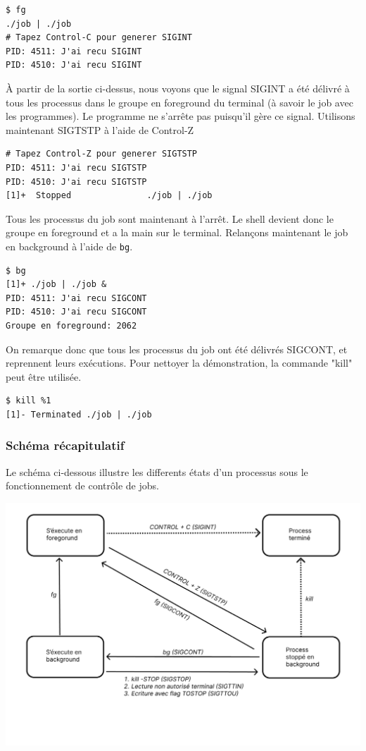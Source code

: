 \begin{lstlisting}[style=blackstyle]
$ fg
./job | ./job
# Tapez Control-C pour generer SIGINT
PID: 4511: J'ai recu SIGINT
PID: 4510: J'ai recu SIGINT
\end{lstlisting}

À partir de la sortie ci-dessus, nous voyons que le signal SIGINT a été délivré à tous les
processus dans le groupe en foreground du terminal (à savoir le job avec les programmes).
Le programme ne s'arrête pas puisqu'il gère ce signal.
\newline
Utilisons maintenant SIGTSTP à l'aide de Control-Z

\begin{lstlisting}[style=blackstyle]
# Tapez Control-Z pour generer SIGTSTP
PID: 4511: J'ai recu SIGTSTP
PID: 4510: J'ai recu SIGTSTP
[1]+  Stopped             	./job | ./job
\end{lstlisting}

Tous les processus du job sont maintenant à l'arrêt. Le shell devient donc le groupe en foreground et a la main
sur le terminal.
\newline
Relançons maintenant le job en background à l'aide de \texttt{bg}.

\begin{lstlisting}[style=blackstyle]
$ bg
[1]+ ./job | ./job &
PID: 4511: J'ai recu SIGCONT
PID: 4510: J'ai recu SIGCONT
Groupe en foreground: 2062
\end{lstlisting}

On remarque donc que tous les processus du job ont été délivrés SIGCONT, et reprennent leurs exécutions.
\newline
Pour nettoyer la démonstration, la commande "kill" peut être utilisée.
\begin{lstlisting}[style=blackstyle]
$ kill %1
[1]- Terminated ./job | ./job
\end{lstlisting}

\subsubsection{Schéma récapitulatif}

Le schéma ci-dessous illustre les differents états d'un processus sous le fonctionnement de contrôle de jobs.

\includegraphics[width=1\textwidth]{img/jobControl.png}





